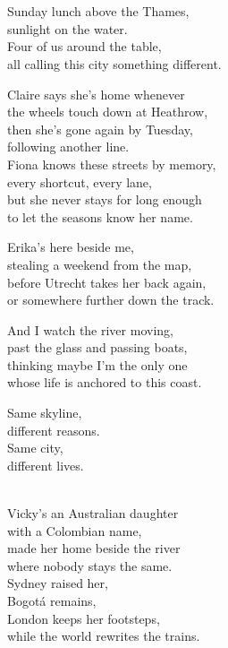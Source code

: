 \begin{lyrics}
\\
\\
Sunday lunch above the Thames,\\
sunlight on the water.\\
Four of us around the table,\\
all calling this city something different.

Claire says she's home whenever\\
the wheels touch down at Heathrow,\\
then she's gone again by Tuesday,\\
following another line.\\
Fiona knows these streets by memory,\\
every shortcut, every lane,\\
but she never stays for long enough\\
to let the seasons know her name.

Erika's here beside me,\\
stealing a weekend from the map,\\
before Utrecht takes her back again,\\
or somewhere further down the track.

And I watch the river moving,\\
past the glass and passing boats,\\
thinking maybe I'm the only one\\
whose life is anchored to this coast.

Same skyline,\\
different reasons.\\
Same city,\\
different lives.

\\
Vicky's an Australian daughter\\
with a Colombian name,\\
made her home beside the river\\
where nobody stays the same.\\
Sydney raised her,\\
Bogotá remains,\\
London keeps her footsteps,\\
while the world rewrites the trains.


\end{lyrics}
